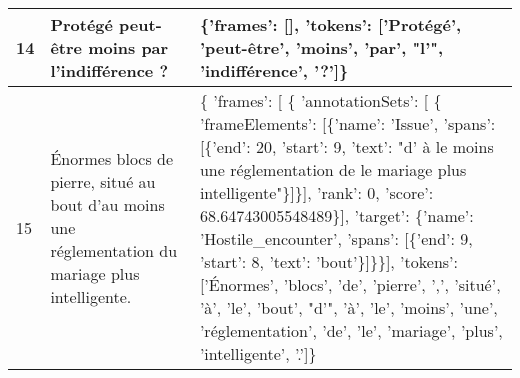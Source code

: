 \documentclass{article}%
\begin{document}
\begin{longtable}{|l |p{5.5cm} |p{9cm}|}
\hline%
14&Protégé peut{-}être moins par l'indifférence ?&\{'frames': {[}{]}, 'tokens': {[}'Protégé', 'peut{-}être', 'moins', 'par', "l'", 'indifférence', '?'{]}\}\\%
\hline%
\rowcolor{lightgray}%
15&Énormes blocs de pierre, situé au bout d'au moins une réglementation du mariage plus intelligente.&\{ 'frames': {[} \{ 'annotationSets': {[} \{ 'frameElements': {[}\{'name': 'Issue', 'spans': {[}\{'end': 20, 'start': 9, 'text': "d' à le moins une réglementation de le mariage plus intelligente"\}{]}\}{]},\newline%
                                      'rank': 0,\newline%
                                      'score': 68.64743005548489\}{]},\newline%
                'target': \{'name': 'Hostile\_encounter', 'spans': {[}\{'end': 9, 'start': 8, 'text': 'bout'\}{]}\}\}{]},\newline%
  'tokens': {[}'Énormes', 'blocs', 'de', 'pierre', ',', 'situé', 'à', 'le', 'bout', "d'", 'à', 'le', 'moins', 'une', 'réglementation', 'de', 'le', 'mariage', 'plus', 'intelligente', '.'{]}\}\\%
\hline%
\end{longtable}

%
\end{document}
